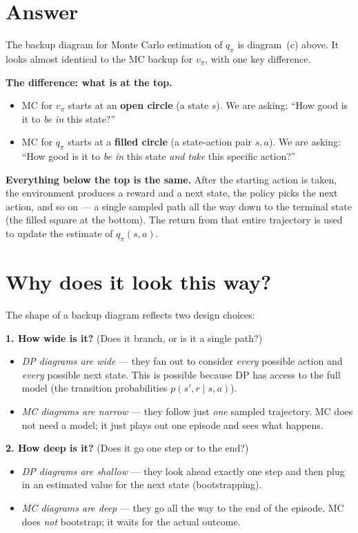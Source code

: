 \documentclass[11pt]{article}
\begin{document}
\section*{Answer}

The backup diagram for Monte Carlo estimation of $q_\pi$ is diagram~(c) above. It looks almost identical to the MC backup for $v_\pi$, with one key difference.

\textbf{The difference: what is at the top.}
\begin{itemize}[nosep]
    \item MC for $v_\pi$ starts at an \textbf{open circle} (a state $s$). We are asking: ``How good is it to \textit{be in} this state?''
    \item MC for $q_\pi$ starts at a \textbf{filled circle} (a state-action pair $s, a$). We are asking: ``How good is it to \textit{be in} this state \textit{and take} this specific action?''
\end{itemize}

\textbf{Everything below the top is the same.} After the starting action is taken, the environment produces a reward and a next state, the policy picks the next action, and so on --- a single sampled path all the way down to the terminal state (the filled square at the bottom). The return from that entire trajectory is used to update the estimate of $q_\pi(s, a)$.

\section*{Why does it look this way?}

The shape of a backup diagram reflects two design choices:

\textbf{1. How wide is it?} (Does it branch, or is it a single path?)
\begin{itemize}[nosep]
    \item \textit{DP diagrams are wide} --- they fan out to consider \textit{every} possible action and \textit{every} possible next state. This is possible because DP has access to the full model (the transition probabilities $p(s', r \mid s, a)$).
    \item \textit{MC diagrams are narrow} --- they follow just \textit{one} sampled trajectory. MC does not need a model; it just plays out one episode and sees what happens.
\end{itemize}

\textbf{2. How deep is it?} (Does it go one step or to the end?)
\begin{itemize}[nosep]
    \item \textit{DP diagrams are shallow} --- they look ahead exactly one step and then plug in an estimated value for the next state (bootstrapping).
    \item \textit{MC diagrams are deep} --- they go all the way to the end of the episode. MC does \textit{not} bootstrap; it waits for the actual outcome.
\end{itemize}
\end{document}
